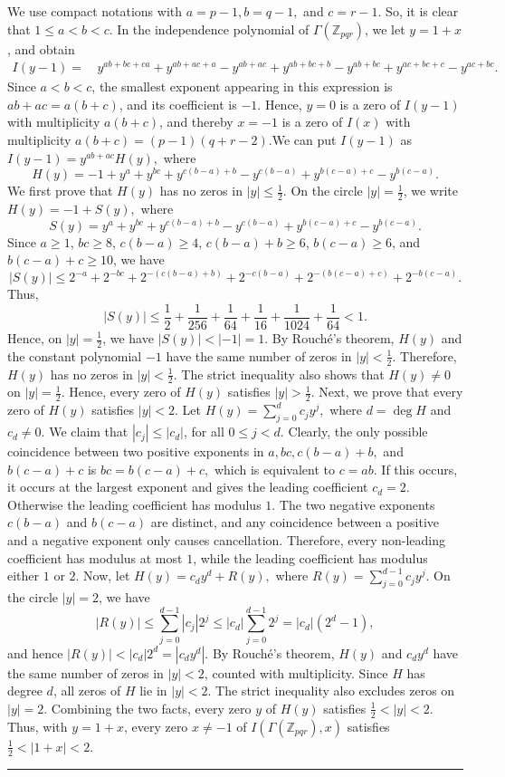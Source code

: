 \documentclass[12pt,twoside]{article}
\renewenvironment{proof}{{\noindent\bfseries Proof.}}{\qed}
\def\qed{\nolinebreak\hfill\rule{.2cm}{.2cm}\par\addvspace{.5cm}}
\begin{document}
\begin{proof}
	We use compact notations with 
	$a=p-1,b=q-1,$ and $ c=r-1.$ So, it is clear that  $1\leq a<b<c$. In the independence polynomial of $\varGamma(\mathbb{Z}_{pqr})$, we let $y=1+x$, and obtain
	\begin{align*}
		I(y-1)
		=&\,y^{ab+bc+ca}+y^{ab+ac+a}-y^{ab+ac}+y^{ab+bc+b}-y^{ab+bc}+y^{ac+bc+c}-y^{ac+bc}.
	\end{align*}
	Since $a<b<c$, the smallest exponent appearing in this expression is $ab+ac=a(b+c)$, and its coefficient is $-1$. Hence, $y=0$ is a zero of $I(y-1)$ with multiplicity $a(b+c)$, and thereby  $x=-1$ is a zero of $I(x)$ with multiplicity
	$
	a(b+c)=(p-1)(q+r-2).
	$We can put $I(y-1)$ as $I(y-1)=y^{ab+ac}H(y),$ 
	where
	$$
	H(y)
	=
	-1+y^a+y^{bc}+y^{c(b-a)+b}-y^{c(b-a)}+y^{b(c-a)+c}-y^{b(c-a)}.
	$$
	 We first prove that $H(y)$ has no zeros in $|y|\leq \tfrac12$. On the circle $|y|=\tfrac12$, we write
	$
	H(y)=-1+S(y),
	$
	where
	$$
	S(y)=y^a+y^{bc}+y^{c(b-a)+b}-y^{c(b-a)}+y^{b(c-a)+c}-y^{b(c-a)}.
	$$
	Since $a\geq 1$, $bc\geq 8$, $c(b-a)\geq 4$, $c(b-a)+b\geq 6$, $b(c-a)\geq 6$, and $b(c-a)+c\geq 10$, we have
	$$
	|S(y)|
	\leq
	2^{-a}+2^{-bc}+2^{-(c(b-a)+b)}+2^{-c(b-a)}
	+2^{-(b(c-a)+c)}+2^{-b(c-a)}.
	$$
	Thus,
	$$
	|S(y)|
	\leq
	\frac12+\frac{1}{256}+\frac{1}{64}+\frac{1}{16}
	+\frac{1}{1024}+\frac{1}{64}
	<1.
	$$
	Hence, on $|y|=\tfrac12$, we have
	$
	|S(y)|<|-1|=1.
	$
	By Rouché's theorem, $H(y)$ and the constant polynomial $-1$ have the same number of zeros in $|y|<\tfrac12$. Therefore, $H(y)$ has no zeros in $|y|<\tfrac12$. The strict inequality also shows that $H(y)\neq 0$ on $|y|=\tfrac12$. Hence, every zero of $H(y)$ satisfies
	$
	|y|>\tfrac12.
	$ Next, we prove that every zero of $H(y)$ satisfies $|y|<2$. Let
	$
	H(y)=\sum_{j=0}^{d}c_jy^j,
	$
	where $d=\deg H$ and $c_d\neq 0$. We claim that
	$|c_j|\leq |c_d|$, for all $0\leq j<d.$
	Clearly, the only possible coincidence between two positive exponents in
	$
	a, bc,c(b-a)+b,$ and $ b(c-a)+c
	$
	is
	$
	bc=b(c-a)+c,
	$
	which is equivalent to $c=ab$. If this occurs, it occurs at the largest exponent and gives the leading coefficient $c_d=2$. Otherwise the leading coefficient has modulus $1$. The two negative exponents $c(b-a)$ and $b(c-a)$ are distinct, and any coincidence between a positive and a negative exponent only causes cancellation. Therefore, every non-leading coefficient has modulus at most $1$, while the leading coefficient has modulus either $1$ or $2$. Now, let 
	$
	H(y)=c_dy^d+R(y),
	$
	where
	$
	R(y)=\sum_{j=0}^{d-1}c_jy^j.
	$
	On the circle $|y|=2$, we have
	$$
	|R(y)|
	\leq
	\sum_{j=0}^{d-1}|c_j|2^j
	\leq
	|c_d|\sum_{j=0}^{d-1}2^j
	=
	|c_d|(2^d-1),
	$$
	and hence 
	$
	|R(y)|<|c_d|2^d=|c_dy^d|.
	$
	By Rouché's theorem, $H(y)$ and $c_dy^d$ have the same number of zeros in $|y|<2$, counted with multiplicity. Since $H$ has degree $d$, all zeros of $H$ lie in $|y|<2$. The strict inequality also excludes zeros on $|y|=2$.
	 Combining the two facts, every zero $y$ of $H(y)$ satisfies
	$
	\tfrac12<|y|<2.
	$
	Thus, with $y=1+x$, every zero $x\neq -1$ of $I(\varGamma(\mathbb{Z}_{pqr}),x)$ satisfies
	$
	\tfrac12<|1+x|<2.
	$ 
\end{proof} 
\end{document}
